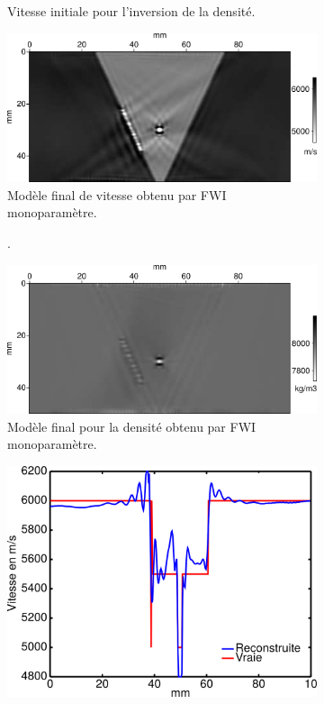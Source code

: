 \begin{figure}[!h]
\begin{changemargin}{-2cm}{-2cm}
\begin{subfigure}[b]{0.29\textwidth}
			\caption{Vitesse initiale pour l'inversion de la densité. }
		\end{subfigure}
		\begin{subfigure}[b]{0.29\textwidth}
			\includegraphics[width=\textwidth]{img/mono_param/vp_mono.png}
			\caption{Modèle final de vitesse obtenu par FWI monoparamètre.}
		\end{subfigure}
		\begin{subfigure}[b]{0.29\textwidth}
			\caption{.}
		\end{subfigure}
		\begin{subfigure}[b]{0.29\textwidth}
			\includegraphics[width=\textwidth]{img/mono_param/rho_mono.png}
			\caption{Modèle final pour la densité obtenu par FWI monoparamètre. }
		\end{subfigure}
			\begin{subfigure}[b]{0.29\textwidth}
			\includegraphics[width=\textwidth]{img/mono_param/coupe_vp_mono.png}

\end{subfigure}
\end{changemargin}
\end{figure}
